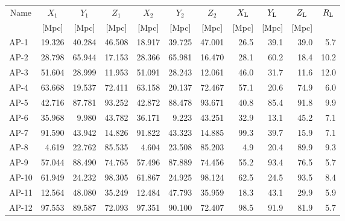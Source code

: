 \begin {tabular}{lrrrrrrrrrr}
\hline
\multicolumn{1}{c}{Name} &
\multicolumn{1}{c}{$X_{1}$} &
\multicolumn{1}{c}{$Y_1$} &
\multicolumn{1}{c}{$Z_1$} &
\multicolumn{1}{c}{$X_2$} &
\multicolumn{1}{c}{$Y_2$} &
\multicolumn{1}{c}{$Z_2$} &
\multicolumn{1}{c}{$X_{\rm L}$} &
\multicolumn{1}{c}{$Y_{\rm L}$} &
\multicolumn{1}{c}{$Z_{\rm L}$} &
\multicolumn{1}{c}{$R_{\rm L}$} \\
&
\multicolumn{1}{c}{[Mpc]} &
\multicolumn{1}{c}{[Mpc]} &
\multicolumn{1}{c}{[Mpc]} &
\multicolumn{1}{c}{[Mpc]} &
\multicolumn{1}{c}{[Mpc]} &
\multicolumn{1}{c}{[Mpc]} &
\multicolumn{1}{c}{[Mpc]} &
\multicolumn{1}{c}{[Mpc]} &
\multicolumn{1}{c}{[Mpc]} \\
\hline
AP-1  & 19.326    & 40.284   &	46.508  &   18.917 &  39.725   &  47.001 &  26.5   &	39.1    &  39.0   & 5.7     \\
AP-2  & 28.798	  & 65.944   &	17.153  &   28.366 &  65.981   &  16.470 &  28.1   & 	60.2    & 18.4	  & 10.2    \\
AP-3  & 51.604    & 28.999   &	11.953  &   51.091 &  28.243   &  12.061 &  46.0   &	31.7    & 11.6    & 12.0     \\
AP-4  & 63.668    & 19.537   &	72.411  &   63.158 &  20.137   &  72.467 &  57.1   &	20.6	& 74.9	  & 6.0     \\
AP-5  & 42.716	  & 87.781   &	93.252  &   42.872 &  88.478   &  93.671 &  40.8   &	85.4    & 91.8    & 9.9     \\
AP-6  & 35.968    & 9.980    &	43.782  &   36.171 &   9.223   &  43.251 &  32.9   &	13.1    & 45.2    & 7.1    \\
AP-7  & 91.590    & 43.942   &	14.826  &   91.822 &  43.323   &  14.885 &  99.3   &	39.7    & 15.9    & 7.1   \\
AP-8  &  4.619    & 22.762   &  85.535  &   4.604  &  23.508   &  85.203 &  4.9    &	20.4    & 89.9    & 9.3   \\
AP-9  &  57.044   & 88.490   &	74.765  &  57.496  &  87.889   & 74.456  &  55.2   &	93.4    & 76.5	  & 5.7   \\
AP-10 & 61.949    & 24.232   &	98.305  &  61.867  & 24.925    & 98.124  &  62.5   & 	24.5    & 93.5    & 8.4   \\
AP-11 &  12.564   & 48.080   &	35.249  &  12.484  & 47.793    & 35.959  &  18.3   &	43.1	& 29.9    &5.9    \\
AP-12 &  97.553   & 89.587   &	72.093  &   97.351 & 90.100    & 72.407  &  98.5   &	91.9    & 81.9    & 5.7   \\
\hline
\end{tabular}
